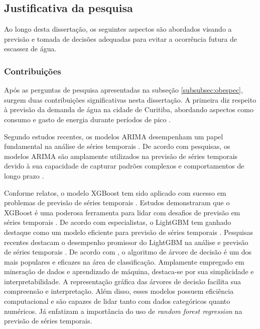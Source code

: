 \subsection{Justificativa da pesquisa} \label{subsec:justif}

Ao longo desta dissertação, os seguintes aspectos são abordados visando a previsão e tomada de decisões adequadas para evitar a ocorrência futura de escassez de água.

\subsubsection{Contribui\c c\~oes} \label{subsubsec:Contribuição}

Após as perguntas de pesquisa apresentadas na subseção \ref{subsubsec:obespec}, surgem duas contribuições significativas nesta dissertação. A primeira diz respeito à previsão da demanda de água na cidade de Curitiba, abordando aspectos como consumo e gasto de energia durante períodos de pico .

Segundo estudos recentes, os modelos ARIMA desempenham um papel fundamental na análise de séries temporais . De acordo com pesquisas, os modelos ARIMA são amplamente utilizados na previsão de séries temporais devido à sua capacidade de capturar padrões complexos e comportamentos de longo prazo .

Conforme relatos, o modelo XGBoost tem sido aplicado com sucesso em problemas de previsão de séries temporais . Estudos demonstraram que o XGBoost é uma poderosa ferramenta para lidar com desafios de previsão em séries temporais . De acordo com especialistas, o LightGBM tem ganhado destaque como um modelo eficiente para previsão de séries temporais . Pesquisas recentes destacam o desempenho promissor do LightGBM na análise e previsão de séries temporais . De acordo com , o algoritmo de árvore de decisão é um dos mais populares e eficazes na área de classificação. Amplamente empregado em mineração de dados e aprendizado de máquina, destaca-se por sua simplicidade e interpretabilidade. A representação gráfica das árvores de decisão facilita sua compreensão e interpretação. Além disso, esses modelos possuem eficiência computacional e são capazes de lidar tanto com dados categóricos quanto numéricos. Já  enfatizam a importância do uso de \textit{random forest regression} na previsão de séries temporais.


